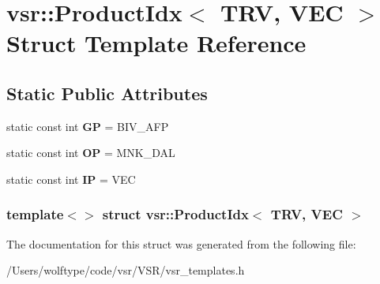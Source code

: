 \hypertarget{structvsr_1_1_product_idx_3_01_t_r_v_00_01_v_e_c_01_4}{\section{vsr\-:\-:Product\-Idx$<$ T\-R\-V, V\-E\-C $>$ Struct Template Reference}
\label{structvsr_1_1_product_idx_3_01_t_r_v_00_01_v_e_c_01_4}
}
\subsection*{Static Public Attributes}
\begin{DoxyCompactItemize}
\item 
\hypertarget{structvsr_1_1_product_idx_3_01_t_r_v_00_01_v_e_c_01_4_abf3ade434ba86c10bb3e183fda63ead1}{static const int {\bfseries G\-P} = B\-I\-V\-\_\-\-A\-F\-P}\label{structvsr_1_1_product_idx_3_01_t_r_v_00_01_v_e_c_01_4_abf3ade434ba86c10bb3e183fda63ead1}

\item 
\hypertarget{structvsr_1_1_product_idx_3_01_t_r_v_00_01_v_e_c_01_4_ad3eae9bf0caa8b5cdf19db8c41034d00}{static const int {\bfseries O\-P} = M\-N\-K\-\_\-\-D\-A\-L}\label{structvsr_1_1_product_idx_3_01_t_r_v_00_01_v_e_c_01_4_ad3eae9bf0caa8b5cdf19db8c41034d00}

\item 
\hypertarget{structvsr_1_1_product_idx_3_01_t_r_v_00_01_v_e_c_01_4_a573d4c7df932ce608960deed99d24025}{static const int {\bfseries I\-P} = V\-E\-C}\label{structvsr_1_1_product_idx_3_01_t_r_v_00_01_v_e_c_01_4_a573d4c7df932ce608960deed99d24025}

\end{DoxyCompactItemize}
\subsubsection*{template$<$$>$ struct vsr\-::\-Product\-Idx$<$ T\-R\-V, V\-E\-C $>$}



The documentation for this struct was generated from the following file\-:\begin{DoxyCompactItemize}
\item 
/\-Users/wolftype/code/vsr/\-V\-S\-R/vsr\-\_\-templates.\-h\end{DoxyCompactItemize}
